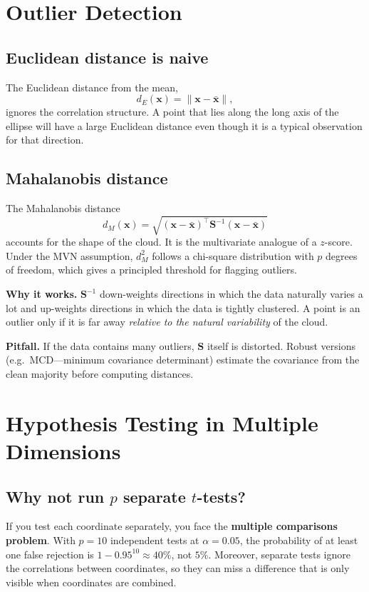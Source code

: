 \documentclass[11pt,a4paper]{article}
\newcommand{\vect}[1]{\mathbf{#1}}
\newcommand{\mat}[1]{\mathbf{#1}}
\begin{document}
\section{Outlier Detection}

\subsection{Euclidean distance is naive}
The Euclidean distance from the mean,
\[
d_E(\vect{x}) = \|\vect{x}-\bar{\vect{x}}\|,
\]
ignores the correlation structure.  A point that lies along the long
axis of the ellipse will have a large Euclidean distance even though
it is a typical observation for that direction.

\subsection{Mahalanobis distance}
The Mahalanobis distance
\[
d_M(\vect{x}) = \sqrt{(\vect{x}-\bar{\vect{x}})^\top
\mat{S}^{-1}(\vect{x}-\bar{\vect{x}})}
\]
accounts for the shape of the cloud.  It is the multivariate analogue
of a $z$-score.  Under the MVN assumption, $d_M^2$ follows a
chi-square distribution with $p$ degrees of freedom, which gives a
principled threshold for flagging outliers.

\textbf{Why it works.}  $\mat{S}^{-1}$ down-weights directions in which
the data naturally varies a lot and up-weights directions in which the
data is tightly clustered.  A point is an outlier only if it is far
away \emph{relative to the natural variability} of the cloud.

\textbf{Pitfall.}  If the data contains many outliers, $\mat{S}$ itself
is distorted.  Robust versions (e.g.\ MCD—minimum covariance
determinant) estimate the covariance from the clean majority before
computing distances.

\section{Hypothesis Testing in Multiple Dimensions}

\subsection{Why not run $p$ separate $t$-tests?}
If you test each coordinate separately, you face the \textbf{multiple
comparisons problem}.  With $p=10$ independent tests at $\alpha=0.05$,
the probability of at least one false rejection is
$1-0.95^{10}\approx 40\%$, not $5\%$.
Moreover, separate tests ignore the correlations between coordinates,
so they can miss a difference that is only visible when coordinates
are combined.
\end{document}

